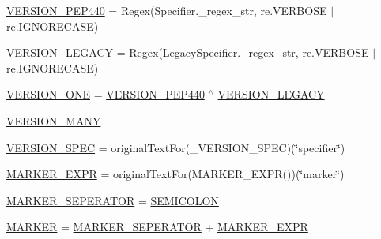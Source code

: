 \begin{DoxyCompactItemize}
\item 
\hyperlink{namespacepkg__resources_1_1__vendor_1_1packaging_1_1requirements_a15e930063e0b47547e70be055c981d1b}{V\+E\+R\+S\+I\+O\+N\+\_\+\+P\+E\+P440} = Regex(Specifier.\+\_\+regex\+\_\+str, re.\+V\+E\+R\+B\+O\+SE $\vert$ re.\+I\+G\+N\+O\+R\+E\+C\+A\+SE)
\item 
\hyperlink{namespacepkg__resources_1_1__vendor_1_1packaging_1_1requirements_a98ae68ecf53fa7d18dc31cd66a05fc3c}{V\+E\+R\+S\+I\+O\+N\+\_\+\+L\+E\+G\+A\+CY} = Regex(Legacy\+Specifier.\+\_\+regex\+\_\+str, re.\+V\+E\+R\+B\+O\+SE $\vert$ re.\+I\+G\+N\+O\+R\+E\+C\+A\+SE)
\item 
\hyperlink{namespacepkg__resources_1_1__vendor_1_1packaging_1_1requirements_a5b81bc2142ede05f3495dd17658f84d9}{V\+E\+R\+S\+I\+O\+N\+\_\+\+O\+NE} = \hyperlink{namespacepkg__resources_1_1__vendor_1_1packaging_1_1requirements_a15e930063e0b47547e70be055c981d1b}{V\+E\+R\+S\+I\+O\+N\+\_\+\+P\+E\+P440} $^\wedge$ \hyperlink{namespacepkg__resources_1_1__vendor_1_1packaging_1_1requirements_a98ae68ecf53fa7d18dc31cd66a05fc3c}{V\+E\+R\+S\+I\+O\+N\+\_\+\+L\+E\+G\+A\+CY}
\item 
\hyperlink{namespacepkg__resources_1_1__vendor_1_1packaging_1_1requirements_af7583a9da6975c06a4e6ec8b45815fc1}{V\+E\+R\+S\+I\+O\+N\+\_\+\+M\+A\+NY}
\item 
\hyperlink{namespacepkg__resources_1_1__vendor_1_1packaging_1_1requirements_a6ec8597b008780bbfa1fc9a46d392c05}{V\+E\+R\+S\+I\+O\+N\+\_\+\+S\+P\+EC} = original\+Text\+For(\+\_\+\+V\+E\+R\+S\+I\+O\+N\+\_\+\+S\+P\+EC)(\char`\"{}specifier\char`\"{})
\item 
\hyperlink{namespacepkg__resources_1_1__vendor_1_1packaging_1_1requirements_a2ae65890a757f8b8afdeecd7c9f36b46}{M\+A\+R\+K\+E\+R\+\_\+\+E\+X\+PR} = original\+Text\+For(M\+A\+R\+K\+E\+R\+\_\+\+E\+X\+PR())(\char`\"{}marker\char`\"{})
\item 
\hyperlink{namespacepkg__resources_1_1__vendor_1_1packaging_1_1requirements_a068f179ab0ebb8bbecb1784f50a265db}{M\+A\+R\+K\+E\+R\+\_\+\+S\+E\+P\+E\+R\+A\+T\+OR} = \hyperlink{namespacepkg__resources_1_1__vendor_1_1packaging_1_1requirements_adedef3a0386c0115ceeccd5722983b22}{S\+E\+M\+I\+C\+O\+L\+ON}
\item 
\hyperlink{namespacepkg__resources_1_1__vendor_1_1packaging_1_1requirements_a77c252a4381e3a258ff2b5e3e0b3b80b}{M\+A\+R\+K\+ER} = \hyperlink{namespacepkg__resources_1_1__vendor_1_1packaging_1_1requirements_a068f179ab0ebb8bbecb1784f50a265db}{M\+A\+R\+K\+E\+R\+\_\+\+S\+E\+P\+E\+R\+A\+T\+OR} + \hyperlink{namespacepkg__resources_1_1__vendor_1_1packaging_1_1requirements_a2ae65890a757f8b8afdeecd7c9f36b46}{M\+A\+R\+K\+E\+R\+\_\+\+E\+X\+PR}

\end{DoxyCompactItemize}
